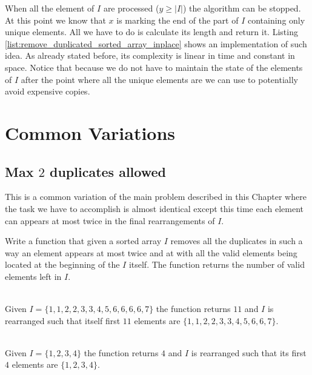 When all the element of $I$ are processed ($y \geq |I|$) the algorithm can be stopped. At this point
we know that $x$ is marking the end of the part of $I$ containing only unique elements. All we have
to do is calculate its length and return it. Listing
\ref{list:remove_duplicated_sorted_array_inplace} shows an implementation of such idea. As already
stated before, its complexity is linear in time and constant in space.
Notice that because we do not have to maintain the state of the elements of $I$ after the point where all the unique elements are
we can use  to potentially avoid expensive copies.

\begin{minipage}{\linewidth}
	
\end{minipage}

\section{Common Variations}
\subsection{Max $2$ duplicates allowed}
This is a common variation of the main problem described in this Chapter where the task 
we have to accomplish is almost identical except this time each element can appears at most 
twice in the final rearrangements of $I$.
\begin{exercise}
	Write a function that given a sorted array $I$ removes all the 
	duplicates in such a way an element appears at most twice and at with all the valid elements being located at the beginning of the $I$ itself.
	The function returns the number of valid elements left in $I$.
	
	\label{example:remove_duplicated_sorted_array_inplace:exercice2}
	
		\begin{example}
			\label{example:remove_duplicated_sorted_array_inplace_variation1:example1}
			\hfill \\
			Given $I=\{1,1,2,2,3,3,4,5,6,6,6,6,7\}$ the function returns $11$ and $I$ is rearranged such
			that itself first $11$ elements are $\{1,1,2,2,3,3,4,5,6,6,7\}$.				
		\end{example}
	
		\begin{example}
			\label{example:remove_duplicated_sorted_array_inplace_variation1:example2}
			\hfill \\
			Given $I=\{1,2,3,4\}$ the function returns $4$ and $I$ is rearranged such that its first $4$
			elements are $\{1,2,3,4\}$.	
		\end{example}
	\end{exercise}

